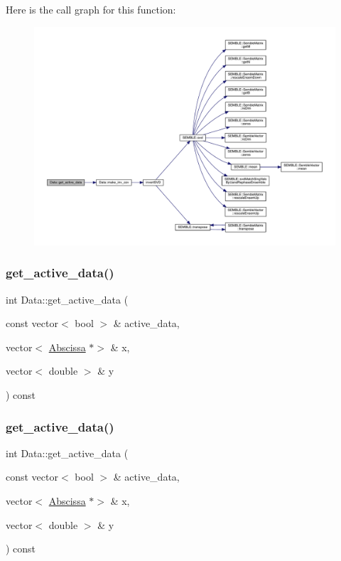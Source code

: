 Here is the call graph for this function\+:
\nopagebreak
\begin{figure}[H]
\begin{center}
\leavevmode
\includegraphics[width=350pt]{d0/df3/classData_acde259686a74799b2fea4d1383d43ec4_cgraph}
\end{center}
\end{figure}
\mbox{\label{classData_a0400209f4bebe1ba6128a11612677c24}} 
\subsubsection{\texorpdfstring{get\_active\_data()}{get\_active\_data()}\hspace{0.1cm}{\footnotesize\ttfamily [3/6]}}
{\footnotesize\ttfamily int Data\+::get\+\_\+active\+\_\+data (\begin{DoxyParamCaption}\item[{const vector$<$ bool $>$ \&}]{active\+\_\+data,  }\item[{vector$<$ \mbox{\hyperlink{classAbscissa}{Abscissa}} $\ast$$>$ \&}]{x,  }\item[{vector$<$ double $>$ \&}]{y }\end{DoxyParamCaption}) const}

\mbox{\label{classData_a0400209f4bebe1ba6128a11612677c24}} 
\subsubsection{\texorpdfstring{get\_active\_data()}{get\_active\_data()}\hspace{0.1cm}{\footnotesize\ttfamily [4/6]}}
{\footnotesize\ttfamily int Data\+::get\+\_\+active\+\_\+data (\begin{DoxyParamCaption}\item[{const vector$<$ bool $>$ \&}]{active\+\_\+data,  }\item[{vector$<$ \mbox{\hyperlink{classAbscissa}{Abscissa}} $\ast$$>$ \&}]{x,  }\item[{vector$<$ double $>$ \&}]{y }\end{DoxyParamCaption}) const}

